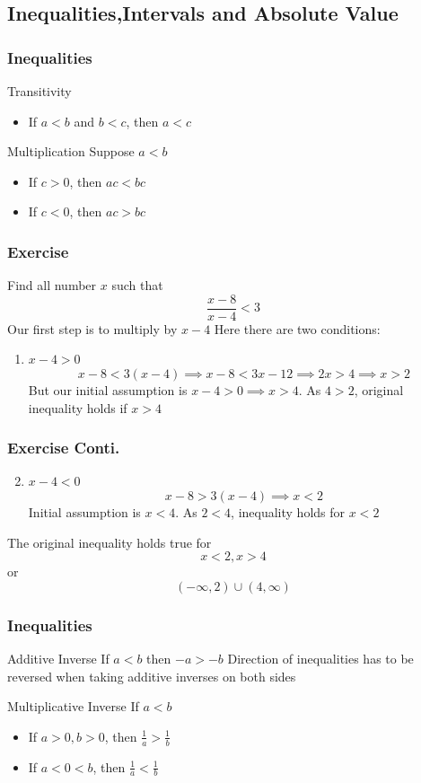 \documentclass{beamer}
\begin{document}
\subsection{Inequalities,Intervals and Absolute Value}
\begin{frame}
  \frametitle{Inequalities}
  \begin{block}{Transitivity}
    \begin{itemize}
        \item If $a < b$ and $b < c$, then $a < c$
      \end{itemize}
  \end{block}
  \begin{block}{Multiplication}
    Suppose $a < b$
    \begin{itemize}
      \item If $c > 0$, then $ac < bc$
      \item If $c <  0$, then $ ac > bc$
    \end{itemize}
  \end{block}
\end{frame} 
\begin{frame}
  \frametitle{Exercise }
  Find all number \( x \) such that 
  \[\frac{x-8}{x-4} < 3 \] 
Our first step  is to multiply by \(x-4\)
Here there are two conditions:
\begin{enumerate}
  \item \( x-4 > 0 \) 
  \[ x -8 < 3(x-4)  \implies x-8 < 3x-12 \implies 2x > 4  \implies x > 2\]
  But our initial assumption is \(x-4 > 0 \implies x > 4 \). As \( 4 > 2 \), original inequality holds if \( x > 4\)
\end{enumerate} 
\end{frame}
\begin{frame}
  \frametitle{Exercise Conti.}
\begin{enumerate}
  \setcounter{enumi}{1}
  \item \( x-4 < 0 \) 
  \[ x-8 > 3(x-4) \implies  x < 2 \] 
  Initial assumption is \( x<4 \). As \( 2 < 4\), inequality holds for \( x < 2 \)
\end{enumerate}
The original inequality holds true for \[x < 2 ,  x > 4 \]   
or 
\[  (-\infty, 2) \cup (4,\infty) \]
\end{frame}
\begin{frame}
  \frametitle{Inequalities}
  \begin{block}{Additive Inverse}
    If \( a < b \) then \( -a > -b \)
    Direction of inequalities has to be reversed when taking additive inverses on both sides 
  \end{block}
  \begin{block}{Multiplicative Inverse}
    If \( a < b \) 
    \begin{itemize}
      \item If \(a > 0, b > 0\), then \(\frac{1}{a} > \frac{1}{b} \)
      \item If \(a < 0 < b\), then \(\frac{1}{a} < \frac{1}{b} \)
    \end{itemize} 
  \end{block}
\end{frame}
\end{document}
